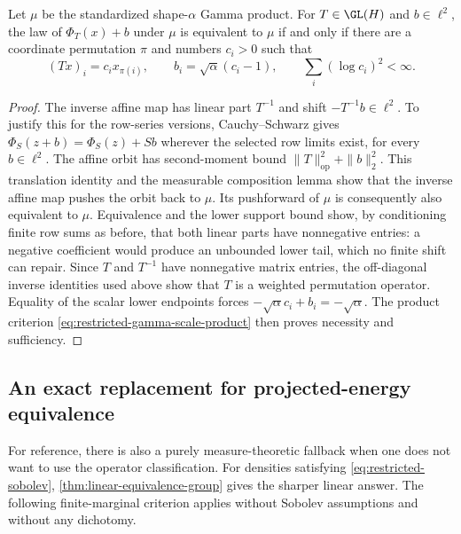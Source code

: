 \begin{corollary}
\label{cor:restricted-gamma-affine}
Let \(\mu\) be the standardized shape-\(\alpha\) Gamma product.
For \(T\in\GL(H)\) and \(b\in\ell^2\), the law of
\(\Phi_T(x)+b\) under \(\mu\) is equivalent to \(\mu\) if and only if
there are a coordinate
permutation \(\pi\) and numbers \(c_i>0\) such that
\[
 (Tx)_i=c_ix_{\pi(i)},\qquad
 b_i=\sqrt\alpha(c_i-1),\qquad
 \sum_i(\log c_i)^2<\infty.
\]
\end{corollary}
\begin{proof}
The inverse affine map has linear part \(T^{-1}\) and shift
\(-T^{-1}b\in\ell^2\).
To justify this for the row-series versions, Cauchy--Schwarz gives
\(\Phi_S(z+b)=\Phi_S(z)+Sb\) wherever the selected row limits exist,
for every \(b\in\ell^2\).
The affine orbit has second-moment bound
\(\|T\|_{\mathrm{op}}^2+\|b\|_2^2\).
This translation identity and the measurable composition lemma show
that the inverse affine map pushes the orbit back to \(\mu\).
Its pushforward of \(\mu\) is consequently also equivalent to \(\mu\).
Equivalence and the lower support bound show, by conditioning
finite row sums as before, that both linear parts have nonnegative
entries: a negative coefficient would produce an unbounded lower
tail, which no finite shift can repair.
Since \(T\) and \(T^{-1}\) have nonnegative matrix entries, the
off-diagonal inverse identities used above show that \(T\) is a
weighted permutation operator.
Equality of the scalar lower endpoints forces
\(-\sqrt\alpha c_i+b_i=-\sqrt\alpha\).
The product criterion \eqref{eq:restricted-gamma-scale-product}
then proves necessity and sufficiency.
\end{proof}

\subsection{An exact replacement for projected-energy equivalence}
\label{sec:restricted-projections}

For reference, there is also a purely measure-theoretic fallback when one
does not want to use the operator classification.
For densities satisfying \eqref{eq:restricted-sobolev},
\cref{thm:linear-equivalence-group} gives the sharper linear answer.
The following finite-marginal criterion applies without Sobolev assumptions
and without any dichotomy.

